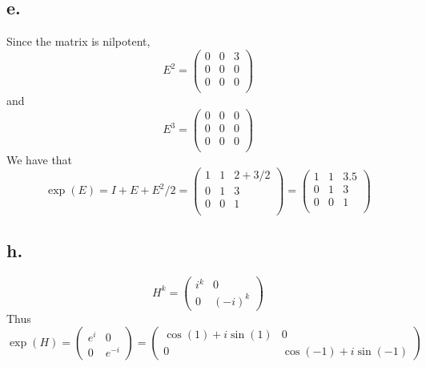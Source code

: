 \documentclass[11pt]{article}
\theoremstyle{mystyle}
\theoremstyle{definition}
\begin{document}
\subsection*{e.}
Since the matrix is nilpotent, 
\[
  E^2 = 
  \begin{pmatrix}
    0 & 0 & 3 \\
    0 & 0 & 0 \\
    0 & 0 & 0 \\
  \end{pmatrix}
\]
and 
\[
  E^{3} = 
  \begin{pmatrix}
    0 & 0 & 0 \\
    0 & 0 & 0 \\
    0 & 0 & 0 \\
  \end{pmatrix}
\]
We have that 
\[
  \exp(E) = I + E + E^2/2 =  
  \begin{pmatrix}
    1 & 1  & 2 + 3/2 \\
    0 & 1 & 3 \\
    0 & 0 & 1 \\
  \end{pmatrix}
  =
  \begin{pmatrix}
    1 & 1  & 3.5 \\
    0 & 1 & 3 \\
    0 & 0 & 1 \\
  \end{pmatrix}
\]
\subsection*{h.}
\[
  H^k = \begin{pmatrix}
    i^k & 0 \\
    0 & (-i)^k
  \end{pmatrix}
\]
Thus 
\[
  \exp(H) = 
  \begin{pmatrix}
    e^i & 0 \\
    0 & e^{-i}
  \end{pmatrix}
  =
  \begin{pmatrix}
    \cos(1) + i\sin(1) & 0 \\
    0 & \cos(-1) + i\sin(-1)
  \end{pmatrix}
\]
\end{document}
